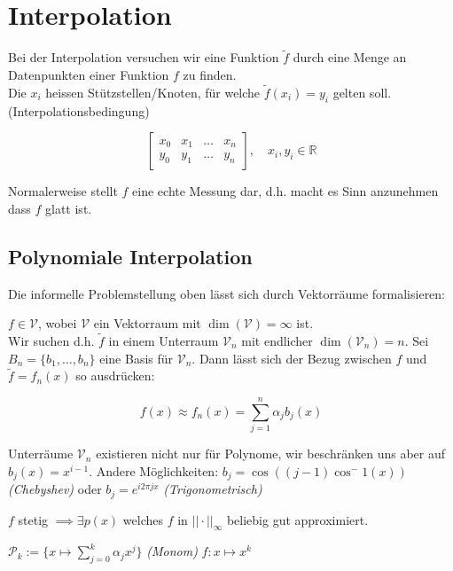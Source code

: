 \newsection
\section{Interpolation}
Bei der Interpolation versuchen wir eine Funktion $\tilde{f}$ durch eine Menge an Datenpunkten einer Funktion $f$ zu finden.\\
Die $x_i$ heissen Stützstellen/Knoten, für welche $\tilde{f}(x_i) = y_i$ gelten soll. (Interpolationsbedingung)

$$ 
\begin{bmatrix}
    x_0 & x_1 & \ldots & x_n \\
    y_0 & y_1 & \ldots & y_n    
\end{bmatrix},
\quad x_i, y_i \in \mathbb{R}
$$

Normalerweise stellt $f$ eine echte Messung dar, d.h. macht es Sinn anzunehmen dass $f$ glatt ist.

\subsection{Polynomiale Interpolation}

Die informelle Problemstellung oben lässt sich durch Vektorräume formalisieren:

$f \in \mathcal{V}$, wobei $\mathcal{V}$ ein Vektorraum mit $\dim(\mathcal{V}) = \infty$ ist. \\
Wir suchen d.h. $\tilde{f}$ in einem Unterraum $\mathcal{V}_n$ mit endlicher $\dim(\mathcal{V}_n) = n$.
Sei $B_n = \{b_1,\ldots,b_n\}$ eine Basis für $\mathcal{V}_n$. 
Dann lässt sich der Bezug zwischen $f$ und $\tilde{f} = f_n(x)$ so ausdrücken:

$$f(x) \approx f_n(x) = \sum_{j=1}^n \alpha_j b_j(x)$$

\setcounter{all}{2}
\inlineremark Unterräume $\mathcal{V}_n$ existieren nicht nur für Polynome, wir beschränken uns aber auf $b_j(x) = x^{i-1}$.
Andere Möglichkeiten: $b_j = \cos((j-1)\cos^-1(x))$ \textit{(Chebyshev)} oder $b_j = e^{i2\pi j x}$ \textit{(Trigonometrisch)}


\setcounter{all}{5}
 $f$ stetig $\implies \exists p(x)$ welches $f$ in $||\cdot||_\infty$ beliebig gut approximiert.

\setcounter{all}{7}
 $\mathcal{P}_k := \{ x \mapsto \sum_{j = 0}^{k} \alpha_j x^j \}$ \inlinedef \textit{(Monom)} $f: x \mapsto x^k$

